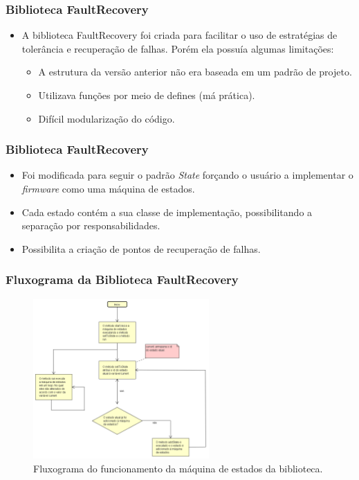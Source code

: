 \begin{frame}
	\frametitle{Biblioteca FaultRecovery}	
	\begin{itemize}
		\item A biblioteca FaultRecovery foi criada para facilitar o uso de estratégias de tolerância e recuperação de falhas. Porém ela possuía algumas limitações:
		\begin{itemize}
			\item A estrutura da versão anterior não era baseada em um padrão de projeto.
			\item Utilizava funções por meio de defines (má prática).	
			\item Difícil modularização do código.	
		\end{itemize}
	\end{itemize}		
\end{frame}

\begin{frame}
	\frametitle{Biblioteca FaultRecovery}	
	\begin{itemize}
		\item Foi modificada para seguir o padrão \textit{State} forçando o usuário a implementar o \textit{firmware} como uma máquina de estados.
		\item Cada estado contém a sua classe de implementação, possibilitando a separação por responsabilidades.
		\item Possibilita a criação de pontos de recuperação de falhas.
	\end{itemize}		
\end{frame}

\begin{frame}
	\frametitle{Fluxograma da Biblioteca FaultRecovery}
	\begin{figure}
		\begin{center}\includegraphics[width=0.6\textwidth]{figuras/fluxoFaultRecovery}\end{center}
		\caption{Fluxograma do funcionamento da máquina de estados da biblioteca.} \label{Fig:fluxoFaultRecovery}
	\end{figure}
\end{frame}

